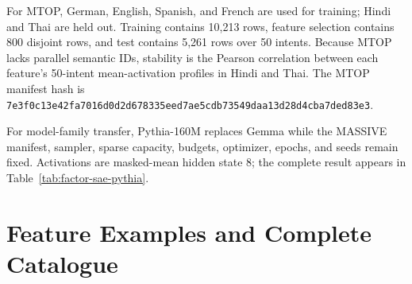 For MTOP, German, English, Spanish, and French are used for training; Hindi and Thai are held out. Training contains 10,213 rows, feature selection contains 800 disjoint rows, and test contains 5,261 rows over 50 intents. Because MTOP lacks parallel semantic IDs, stability is the Pearson correlation between each feature's 50-intent mean-activation profiles in Hindi and Thai. The MTOP manifest hash is \texttt{7e3f0c13e42fa7016d0d2d678335eed7ae5cdb73549daa13d28d4cba7ded83e3}.

For model-family transfer, Pythia-160M replaces Gemma while the MASSIVE manifest, sampler, sparse capacity, budgets, optimizer, epochs, and seeds remain fixed. Activations are masked-mean hidden state 8; the complete result appears in Table~\ref{tab:factor-sae-pythia}.

\begin{table}[h]
\centering
\caption{MASSIVE model-family transfer with Pythia-160M (three paired seeds). Lower locale probe, locale fraction, and $z_S$ intent are better.}
\label{tab:factor-sae-pythia}
\end{table}

\section{Feature Examples and Complete Catalogue}
\label{app:feature-examples}

